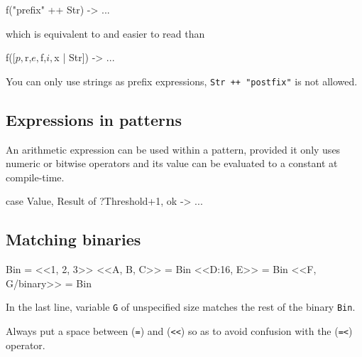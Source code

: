 \begin{erlang}
f("prefix" ++ Str) -> ...
\end{erlang}

which is equivalent to and easier to read than

\begin{erlang}
f([$p,$r,$e,$f,$i,$x | Str]) -> ...
\end{erlang}

You can only use strings as prefix expressions, \texttt{Str ++ "postfix"} is not allowed. 

\subsection{Expressions in patterns}
An arithmetic expression can be used within a pattern, provided it
only uses numeric or bitwise operators and its value can be evaluated
to a constant at compile-time.

\begin{erlang}
case {Value, Result} of
    {?Threshold+1, ok} -> ...   %
\end{erlang}


\subsection{Matching binaries}

\begin{erlang}
Bin = <<1, 2, 3>>               %
<<A, B, C>> = Bin               %
<<D:16, E>> = Bin               %
<<F, G/binary>> = Bin           %
\end{erlang}

In the last line, variable \texttt{G} of unspecified size matches the
rest of the binary \texttt{Bin}.

Always put a space between (\texttt{=}) and (\verb|<<|) so as to
avoid confusion with the (\texttt{=<}) operator.